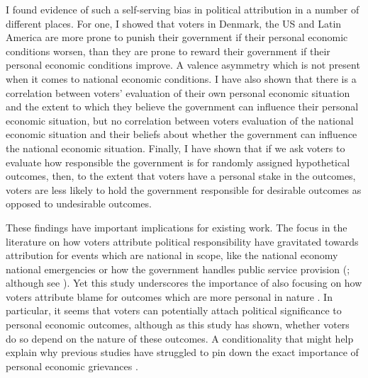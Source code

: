 \documentclass[a4paper,11pt]{article}
\begin{document}
	I found evidence of such a self-serving bias in political attribution in a number of different places. For one, I showed that voters in Denmark, the US and Latin America are more prone to punish their government if their personal economic conditions worsen, than they are prone to reward their government if their personal economic conditions improve. A valence asymmetry which is not present when it comes to national economic conditions. I have also shown that there is a correlation between voters' evaluation of their own personal economic situation and the extent to which they believe the government can influence their personal economic situation, but no correlation between voters evaluation of the national economic situation and their beliefs about whether the government can influence the national economic situation. Finally, I have shown that if we ask voters to evaluate how responsible the government is for randomly assigned hypothetical outcomes, then, to the extent that voters have a personal stake in the outcomes, voters are less likely to hold the government responsible for desirable outcomes as opposed to undesirable outcomes.
	
	These findings have important implications for existing work. The focus in the literature on how voters attribute political responsibility have gravitated towards attribution for events which are national in scope, like the national economy \citep{duch2008economic,alcaniz2011se} national emergencies \citep{malhotra2008attributing,healy2014partisaen} or how the government handles public service provision (\citealp{tilley2011government}; although see \citealp{tilley2017pound}). Yet this study underscores the importance of also focusing on how voters attribute blame for outcomes which are more personal in nature \citep{kinder1979economic,feldman1982economic,giuliano2009growing,ansell2014political}. In particular, it seems that voters can potentially attach political significance to personal economic outcomes, although as this study has shown, whether voters do so depend on the nature of these outcomes. A conditionality that might help explain why previous studies have struggled to pin down the exact importance of personal economic grievances \citep{lewis2013vp,nannestad1994vp,kinder1981sociotropic,stubager2014scope}.
	
\end{document}

